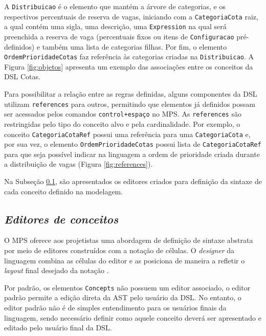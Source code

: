 A \texttt{Distribuicao} é o elemento que mantém a árvore de categorias, e os respectivos percentuais de reserva de vagas, iniciando com a \texttt{CategoriaCota} raiz, a qual contém uma sigla, uma descrição, uma \texttt{Expression} na qual será preenchida a reserva de vaga (percentuais fixos ou itens de \texttt{Configuracao} pré-definidos) e também uma lista de categorias filhas. Por fim, o elemento \texttt{OrdemPrioridadeCotas} faz referência às categorias criadas na \texttt{Distribuicao}. A Figura \ref{fig:objetos} apresenta um exemplo das associações entre os conceitos da DSL Cotas.



\newpage
Para possibilitar a relação entre as regras definidas, alguns componentes da \gls{DSL} utilizam \texttt{references} para outros, permitindo que elementos já definidos possam ser acessados pelos comandos \texttt{control+espaço} no \gls{MPS}. As \texttt{references} são restringidas pelo tipo do conceito alvo e pela cardinalidade. Por exemplo, o conceito \texttt{CategoriaCotaRef} possui uma referência para uma \texttt{CategoriaCota} e, por sua vez, o elemento \texttt{OrdemPrioridadeCotas} possui lista de \texttt{CategoriaCotaRef} para que seja possível indicar na linguagem a ordem de prioridade criada durante a distribuição de vagas (Figura \ref{fig:references}).




Na Subseção \ref{sub:sec:editores}, são apresentados os editores criados para definição da sintaxe de cada conceito definido na modelagem.


\subsection{\textit{Editores de conceitos}}
\label{sub:sec:editores}
O \gls{MPS} oferece aos projetistas uma abordagem de definição de sintaxe abstrata por meio de editores construídos com a notação de células. O \textit{designer} da linguagem combina as células do editor e as posiciona de maneira a refletir o \textit{layout} final desejado da notação \cite{jetbrains}. 

Por padrão, os elementos \texttt{Concepts} não possuem um editor associado, o editor padrão permite a edição direta da \gls{AST} pelo usuário da DSL. No entanto, o editor padrão não é de simples entendimento para os usuários finais da linguagem, sendo necessário definir como aquele conceito deverá ser apresentado e editado pelo usuário final da DSL.

